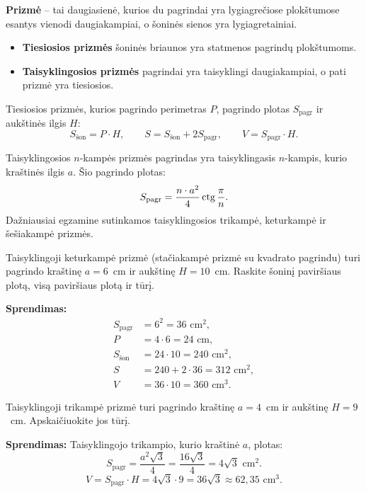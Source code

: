 \begin{definition}
\textbf{Prizmė} -- tai daugiasienė, kurios du pagrindai yra lygiagrečiose plokštumose esantys vienodi daugiakampiai, o šoninės sienos yra lygiagretainiai.
\begin{itemize}
    \item \textbf{Tiesiosios prizmės} šoninės briaunos yra statmenos pagrindų plokštumoms.
    \item \textbf{Taisyklingosios prizmės} pagrindai yra taisyklingi daugiakampiai, o pati prizmė yra tiesiosios.
\end{itemize}
\end{definition}

\begin{theorem}
Tiesiosios prizmės, kurios pagrindo perimetras $P$, pagrindo plotas $S_{\text{pagr}}$ ir aukštinės ilgis $H$:
\[
S_{\text{šon}} = P \cdot H, \qquad S = S_{\text{šon}} + 2S_{\text{pagr}}, \qquad V = S_{\text{pagr}} \cdot H.
\]
\end{theorem}

\begin{remark}
Taisyklingosios $n$-kampės prizmės pagrindas yra taisyklingasis $n$-kampis, kurio kraštinės ilgis $a$. Šio pagrindo plotas:
\[
S_{\text{pagr}} = \frac{n \cdot a^2}{4} \operatorname{ctg}\frac{\pi}{n}.
\]
Dažniausiai egzamine sutinkamos taisyklingosios trikampė, keturkampė ir šešiakampė prizmės.
\end{remark}

\begin{example}
Taisyklingoji keturkampė prizmė (stačiakampė prizmė su kvadrato pagrindu) turi pagrindo kraštinę $a = 6$~cm ir aukštinę $H = 10$~cm. Raskite šoninį paviršiaus plotą, visą paviršiaus plotą ir tūrį.

\textbf{Sprendimas:}
\begin{align*}
S_{\text{pagr}} &= 6^2 = 36 \text{ cm}^2,\\
P &= 4 \cdot 6 = 24 \text{ cm},\\
S_{\text{šon}} &= 24 \cdot 10 = 240 \text{ cm}^2,\\
S &= 240 + 2 \cdot 36 = 312 \text{ cm}^2,\\
V &= 36 \cdot 10 = 360 \text{ cm}^3.
\end{align*}
\end{example}

\begin{example}
Taisyklingoji trikampė prizmė turi pagrindo kraštinę $a = 4$~cm ir aukštinę $H = 9$~cm. Apskaičiuokite jos tūrį.

\textbf{Sprendimas:} Taisyklingojo trikampio, kurio kraštinė $a$, plotas:
\[
S_{\text{pagr}} = \frac{a^2\sqrt{3}}{4} = \frac{16\sqrt{3}}{4} = 4\sqrt{3} \text{ cm}^2.
\]
\[
V = S_{\text{pagr}} \cdot H = 4\sqrt{3} \cdot 9 = 36\sqrt{3} \approx 62{,}35 \text{ cm}^3.
\]
\end{example}

